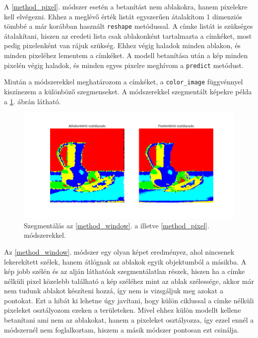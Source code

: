 A \ref{method_pixel}. módszer esetén a betanítást nem ablakokra, hanem pixelekre kell elvégezni. Ehhez a meglévő érték listát egyszerűen átalakítom 1 dimenziós tömbbé a már korábban használt \texttt{reshape} metódussal. A címke listát is szükséges átalakítani, hiszen az eredeti lista csak ablakonként tartalmazta a címkéket, most pedig pixelenként van rájuk szükség. Ehhez végig haladok minden ablakon, és minden pixeléhez lementem a címkéket. A modell betanítása után a kép minden pixelén végig haladok, és minden egyes pixelre meghívom a \texttt{predict} metódust. 

Miután a módszerekkel meghatározom a címkéket, a \texttt{color\_image} függvénnyel kiszínezem a különböző szegmenseket. A módszerekkel szegmentált képekre példa a \ref{fig:window_pixel_segmentation}. ábrán látható.

\begin{figure}[h]
\centering
\includegraphics[scale=0.5]{images/window_pixel_segmentation.png}
\caption{Szegmentálás az \ref{method_window}. a illetve \ref{method_pixel}. módszerekkel.}
\label{fig:window_pixel_segmentation}
\end{figure}

Az \ref{method_window}. módszer egy olyan képet eredményez, ahol nincsenek lekerekített szélek, hanem átlógnak az ablakok egyik objektumból a másikba. A kép jobb szélén és az alján láthatóak szegmentálatlan részek, hiszen ha a címke nélküli pixel közelebb található a kép széléhez mint az ablak szélessége, akkor már nem tudunk ablakot készíteni hozzá, így nem is vizsgáljuk meg azokat a pontokat. Ezt a hibát ki lehetne úgy javítani, hogy külön ciklussal a címke nélküli pixeleket osztályozom ezeken a területeken. Mivel ehhez külön modellt kellene betanítani ami nem az ablakokat, hanem a pixeleket osztályozza, így ezzel ennél a módszernél nem foglalkoztam, hiszem a másik módszer pontosan ezt csinálja. 

